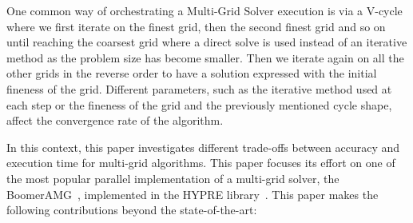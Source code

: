 One common way of orchestrating a Multi-Grid Solver execution is via a V-cycle where we first iterate on the finest grid, then the second finest grid and so on until reaching
the coarsest grid where a direct solve is used instead of an iterative method as the problem size has become smaller. 
Then we iterate again on all the other grids in the reverse order to have a solution expressed with the initial fineness of the grid.
Different parameters, such as the iterative method used at each step or the fineness of the grid and the previously mentioned cycle shape, affect the convergence rate of the algorithm.


In this context, this paper investigates different trade-offs between accuracy and execution time for multi-grid algorithms. 
This paper focuses its effort on one of the most popular parallel implementation of a multi-grid solver,
the BoomerAMG~\cite{boomerAMG}, implemented in the HYPRE library~\cite{Falgout2002}. 
This paper makes the following contributions beyond the state-of-the-art:

